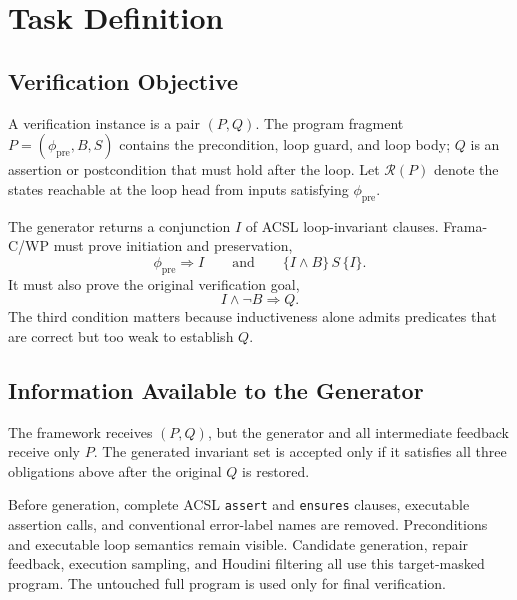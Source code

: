 \section{Task Definition}\label{sec:overview}

\subsection{Verification Objective}
\label{sec:overview:task}

A verification instance is a pair \((P,Q)\).
The program fragment \(P=(\phi_{\mathrm{pre}},B,S)\) contains the
precondition, loop guard, and loop body; \(Q\) is an assertion or
postcondition that must hold after the loop.  Let \(\mathcal R(P)\) denote the
states reachable at the loop head from inputs satisfying
\(\phi_{\mathrm{pre}}\).

The generator returns a conjunction \(I\) of ACSL loop-invariant clauses.
Frama-C/WP must prove initiation and preservation,
\[
  \phi_{\mathrm{pre}}\Rightarrow I
  \qquad\text{and}\qquad
  \{I\wedge B\}\,S\,\{I\}.
\]
It must also prove the original verification goal,
\[
  I\wedge\neg B\Rightarrow Q.
\]
The third condition matters because inductiveness alone admits predicates that
are correct but too weak to establish \(Q\).

\subsection{Information Available to the Generator}
\label{sec:overview:visibility}

\begin{definition}
The framework receives \((P,Q)\), but the generator and all intermediate
feedback receive only \(P\).  The generated invariant set is accepted only if
it satisfies all three obligations above after the original \(Q\) is restored.
\end{definition}

Before generation, complete ACSL \texttt{assert} and \texttt{ensures} clauses,
executable assertion calls, and conventional error-label names are removed.
Preconditions and executable loop semantics remain visible.  Candidate
generation, repair feedback, execution sampling, and Houdini filtering all use
this target-masked program.  The untouched full program is used only for final
verification.

